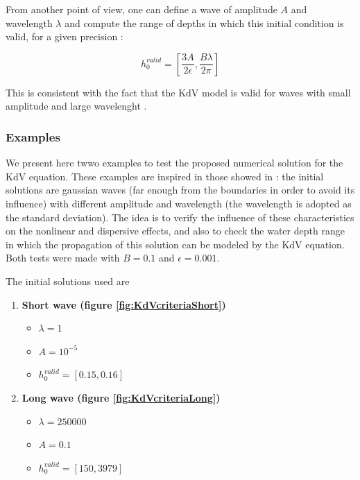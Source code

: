 \indent From another point of view, one can define a wave of amplitude $A$ and wavelength $\lambda$ and compute the range of depths in which this initial condition is valid, for a given precision : 

\begin{equation} 
\label{eq:hvalid}
h_0^{valid} = \left[ \frac{3A}{2\epsilon}, \frac{B\lambda}{2\pi}\right]
\end{equation}

\indent This is consistent with the fact that the KdV model is valid for waves with small amplitude and large wavelenght \cite{BBM1971}.

\subsubsection{Examples}

\indent We present here twwo examples to test the proposed numerical solution for the KdV equation. These examples are inspired in those showed in \cite{conservationLaws2002}: the initial solutions are gaussian waves (far enough from the boundaries in order to avoid its influence) with different amplitude and wavelength (the wavelength is adopted as the standard deviation). The idea is to verify the influence of these characteristics on the nonlinear and dispersive effects, and also to check the water depth range in which the propagation of this solution can be modeled by the KdV equation.  Both tests were made with $B = 0.1$ and $\epsilon = 0.001$.

\indent The initial solutions used are

\begin{enumerate}
	\item \textbf{Short wave (figure \ref{fig:KdVcriteriaShort})} %
		\begin{itemize}
			\item $\lambda = 1$
			\item $ A = 10^{-5}$
			\item $ h_0^{valid} = [0.15, 0.16] $
		\end{itemize}
	\item \textbf{Long wave (figure \ref{fig:KdVcriteriaLong})} %
		\begin{itemize}
			\item $\lambda = 250000$
			\item $ A = 0.1$
			\item $ h_0^{valid} = [150, 3979] $
		\end{itemize}
\end{enumerate}

